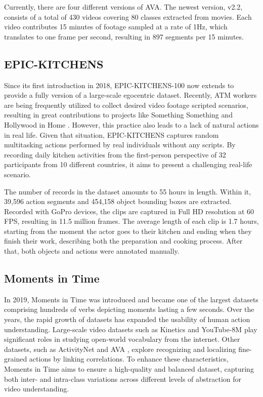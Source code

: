 \documentclass[a4paper]{article}
\begin{document}
Currently, there are four different versions of AVA. The newest version, v2.2, consists of a total of 430 videos covering 80 classes extracted from movies. Each video contributes 15 minutes of footage sampled at a rate of 1Hz, which translates to one frame per second, resulting in 897 segments per 15 minutes.

\subsection{EPIC-KITCHENS}
Since its first introduction in 2018, EPIC-KITCHENS-100 \cite{EPIC-KITCHENS} now extends to provide a fully version of a large-scale egocentric dataset. Recently, ATM workers are being frequently utilized to collect desired video footage scripted scenarios, resulting in great contributions to projects like Something Something \cite{SomethingV1} and Hollywood in Home \cite{Charades}. However, this practice also leads to a lack of natural actions in real life. Given that situation, EPIC-KITCHENS captures random multitasking actions performed by real individuals without any scripts. By recording daily kitchen activities from the first-person perspective of 32 participants from 10 different countries, it aims to present a challenging real-life scenario.

The number of records in the dataset amounts to 55 hours in length. Within it, 39,596 action segments and 454,158 object bounding boxes are extracted. Recorded with GoPro devices, the clips are captured in Full HD resolution at 60 FPS, resulting in 11.5 million frames. The average length of each clip is 1.7 hours, starting from the moment the actor goes to their kitchen and ending when they finish their work, describing both the preparation and cooking process. After that, both objects and actions were annotated manually.

\subsection{Moments in Time}
In 2019, Moments in Time \cite{momentsintime} was introduced and became one of the largest datasets comprising hundreds of verbs depicting moments lasting a few seconds. Over the years, the rapid growth of datasets has expanded the usability of human action understanding. Large-scale video datasets such as Kinetics and YouTube-8M \cite{YouTube8M} play significant roles in studying open-world vocabulary from the internet. Other datasets, such as ActivityNet \cite{ActivityNet} and AVA \cite{AVA}, explore recognizing and localizing fine-grained actions by linking correlations. To enhance these characteristics, Moments in Time aims to ensure a high-quality and balanced dataset, capturing both inter- and intra-class variations across different levels of abstraction for video understanding.
\end{document}
